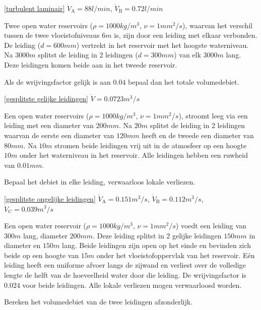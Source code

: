 \begin{antwoord}{\ref{turbulent laminair}}
	$\dot{V}_\mathrm{A} = 88 \unit{l/min}$, $\dot{V}_\mathrm{B} = 0.72 \unit{l/min}$
\end{antwoord}
\begin{toepassing}
	\label{gesplitste gelijke leidingen}
Twee open water reservoirs ($\rho=1000 \unit{kg/m^3}$, $\nu=1 \unit{mm^2/s}$), waarvan het verschil tussen de twee vloeistofniveaus $6 \unit{m}$ is, zijn door een leiding met elkaar verbonden. De leiding ($d=600 \unit{mm}$) vertrekt in het reservoir met het hoogste waterniveau. Na $3000 \unit{m}$ splitst de leiding in 2 leidingen ($d=300 \unit{mm}$) van elk $3000 \unit{m}$ lang. Deze leidingen komen beide aan in het tweede reservoir. 
		
Als de wrijvingsfactor gelijk is aan $0.04$ bepaal dan het totale volumedebiet. 
\end{toepassing}
\begin{antwoord}{\ref{gesplitste gelijke leidingen}}
	$\dot{V} = 0.0723 \unit{m^3/s}$
\end{antwoord}
\begin{toepassing}[*]
	\label{gesplitste ongelijke leidingen}
Een open water reservoirs ($\rho=1000 \unit{kg/m^3}$, $\nu=1 \unit{mm^2/s}$), stroomt leeg via een leiding met een diameter van $200 \unit{mm}$. Na $20 \unit{m}$ splitst de leiding in 2 leidingen waarvan de eerste een diameter van $120 \unit{mm}$ heeft en de tweede een diameter van $80 \unit{mm}$. Na $10 \unit{m}$ stromen beide leidingen vrij uit in de atmosfeer op een hoogte $10 \unit{m}$ onder het waterniveau in het reservoir. Alle leidingen hebben een ruwheid van $0.01 \unit{mm}$.

Bepaal het debiet in elke leiding, verwaarloos lokale verliezen.
\end{toepassing}
\begin{antwoord}{\ref{gesplitste ongelijke leidingen}}
	$\dot{V}_\mathrm{A} = 0.151 \unit{m^3/s}$, $\dot{V}_\mathrm{B} = 0.112 \unit{m^3/s}$,\\
	$\dot{V}_\mathrm{C} = 0.039 \unit{m^3/s}$
\end{antwoord}
\begin{toepassing}
	\label{geperforeerde leiding debiet}
Een open water reservoir ($\rho=1000 \unit{kg/m^3}$, $\nu=1 \unit{mm^2/s}$) voedt een leiding van $300 \unit{m}$ lang, diameter $200 \unit{mm}$. Deze leiding splitst in 2 gelijke leidingen $150 \unit{mm}$ in diameter en $150 \unit{m}$ lang. Beide leidingen zijn open op het einde en bevinden zich beide op een hoogte van $15 \unit{m}$ onder het vloeistofoppervlak van het reservoir. Eén leiding heeft een uniforme afvoer langs de zijwand en verliest over de volledige lengte de helft van de hoeveelheid water door die leiding. De wrijvingsfactor is $0.024$ voor beide leidingen. Alle lokale verliezen mogen verwaarloosd worden.
		
Bereken het volumedebiet van de twee leidingen afzonderlijk. 
\end{toepassing}
